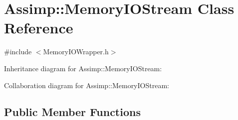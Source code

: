 \hypertarget{class_assimp_1_1_memory_i_o_stream}{\section{Assimp\+:\+:Memory\+I\+O\+Stream Class Reference}
\label{class_assimp_1_1_memory_i_o_stream}
}


{\ttfamily \#include $<$Memory\+I\+O\+Wrapper.\+h$>$}



Inheritance diagram for Assimp\+:\+:Memory\+I\+O\+Stream\+:


Collaboration diagram for Assimp\+:\+:Memory\+I\+O\+Stream\+:
\subsection*{Public Member Functions}

